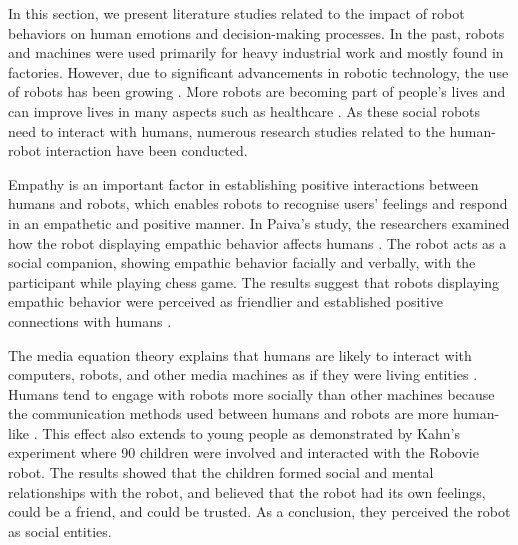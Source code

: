 \documentclass[conference]{IEEEtran}
\begin{document}


In this section, we present literature studies related to the impact of robot behaviors on human emotions and decision-making processes. In the past, robots and machines were used primarily for heavy industrial work and mostly found in factories. However, due to significant advancements in robotic technology, the use of robots has been growing \cite{horstmann_robots_2018}. More robots are becoming part of people's lives and can improve lives in many aspects such as healthcare \cite{olaronke_state_2017}. As these social robots need to interact with humans, numerous research studies related to the human-robot interaction have been conducted.

Empathy is an important factor in establishing positive interactions between humans and robots, which enables robots to recognise users’ feelings and respond in an empathetic and positive manner. In Paiva's study, the researchers examined how the robot displaying empathic behavior affects humans \cite{leite_influence_2013}. The robot acts as a social companion, showing empathic behavior facially and verbally, with the participant while playing chess game. The results suggest that  robots displaying empathic behavior were perceived as friendlier and established positive connections with humans \cite{leite_influence_2013}.

The media equation theory explains that humans are likely to interact with computers, robots, and other media machines as if they were living entities \cite{reeves_media_1996}. Humans tend to engage with robots more socially than other machines because the communication methods used between humans and robots are more human-like \cite{horstmann_robots_2018}. This effect also extends to young people as demonstrated by Kahn's experiment \cite{kahn_jr_robovie_2012} where 90 children were involved and interacted with the Robovie robot. The results showed that the children formed social and mental relationships with the robot, and believed that the robot had its own feelings, could be a friend, and could be trusted. As a conclusion, they perceived the robot as social entities.
\end{document}

